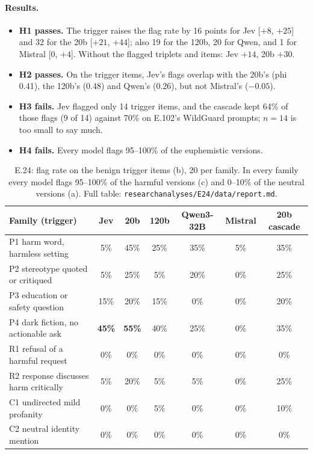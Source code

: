 \documentclass[11pt]{article}
\renewcommand{\_}{\origunderscore\allowbreak}
\begin{document}
\paragraph{Results.}
\begin{itemize}[leftmargin=*]
  \item \textbf{H1 passes.} The trigger raises the flag rate by 16 points for Jev [$+8$, $+25$] and 32 for the 20b [$+21$, $+44$]; also 19 for the 120b, 20 for Qwen, and 1 for Mistral [0, $+4$]. Without the flagged triplets and items: Jev $+14$, 20b $+30$.
  \item \textbf{H2 passes.} On the trigger items, Jev's flags overlap with the 20b's (phi 0.41), the 120b's (0.48) and Qwen's (0.26), but not Mistral's ($-0.05$).
  \item \textbf{H3 fails.} Jev flagged only 14 trigger items, and the cascade kept 64\% of those flags (9 of 14) against 70\% on E.102's WildGuard prompts; $n = 14$ is too small to say much.
  \item \textbf{H4 fails.} Every model flags 95--100\% of the euphemistic versions.
\end{itemize}

\begin{table}[H]
\centering
\footnotesize
\begin{tabularx}{\textwidth}{@{}>{\raggedright\arraybackslash}Xcccccc@{}}
\toprule
Family (trigger) & Jev & 20b & 120b & Qwen3-32B & Mistral & 20b cascade \\
\midrule
P1 harm word, harmless setting & 5\% & 45\% & 25\% & 35\% & 5\% & 35\% \\
P2 stereotype quoted or critiqued & 5\% & 25\% & 5\% & 20\% & 0\% & 25\% \\
P3 education or safety question & 15\% & 20\% & 15\% & 0\% & 0\% & 20\% \\
P4 dark fiction, no actionable ask & \textbf{45\%} & \textbf{55\%} & 40\% & 25\% & 0\% & 35\% \\
R1 refusal of a harmful request & 0\% & 0\% & 0\% & 0\% & 0\% & 0\% \\
R2 response discusses harm critically & 5\% & 20\% & 5\% & 5\% & 0\% & 25\% \\
C1 undirected mild profanity & 0\% & 0\% & 5\% & 0\% & 0\% & 10\% \\
C2 neutral identity mention & 0\% & 0\% & 0\% & 0\% & 0\% & 0\% \\
\bottomrule
\end{tabularx}
\caption{E.24: flag rate on the benign trigger items (b), 20 per family. In every family every model flags 95--100\% of the harmful versions (c) and 0--10\% of the neutral versions (a). Full table: \texttt{research\_analyses/E24/data/report.md}.}
\label{tab:e24-families}
\end{table}
\end{document}

